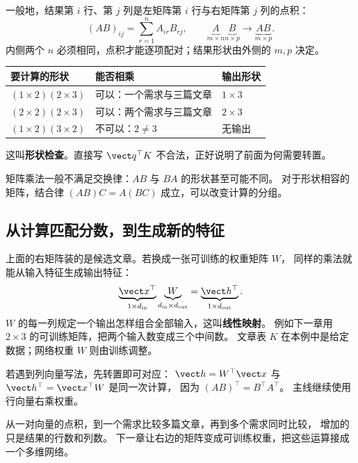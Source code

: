 一般地，结果第 $i$ 行、第 $j$ 列是左矩阵第 $i$ 行与右矩阵第 $j$ 列的点积：
\[
(AB)_{ij}=\sum_{r=1}^{n}A_{ir}B_{rj},\qquad
\underbrace{A}_{m\times n}\underbrace{B}_{n\times p}
\longrightarrow\underbrace{AB}_{m\times p}.
\]
内侧两个 $n$ 必须相同，点积才能逐项配对；结果形状由外侧的 $m,p$ 决定。
\begin{center}\small
{}
\begin{tabular}{@{}lll@{}}\toprule
要计算的形状 & 能否相乘 & 输出形状\\\midrule
$(1\times2)(2\times3)$ & 可以：一个需求与三篇文章 & $1\times3$\\
$(2\times2)(2\times3)$ & 可以：两个需求与三篇文章 & $2\times3$\\
$(1\times2)(3\times2)$ & 不可以：$2\ne3$ & 无输出\\\bottomrule
\end{tabular}
\end{center}
这叫\textbf{形状检查}。直接写 $\vect q^\top K$ 不合法，正好说明了前面为何需要转置。

\begin{warningbox}
矩阵乘法一般不满足交换律：$AB$ 与 $BA$ 的形状甚至可能不同。
对于形状相容的矩阵，结合律 $(AB)C=A(BC)$ 成立，可以改变计算的分组。
\end{warningbox}

\subsection{从计算匹配分数，到生成新的特征}
\label{concept:linear-map}

上面的右矩阵装的是候选文章。若换成一张可训练的权重矩阵 $W$，
同样的乘法就能从输入特征生成输出特征：
\[
\underbrace{\vect x^\top}_{1\times d_{\rm in}}
\underbrace{W}_{d_{\rm in}\times d_{\rm out}}
=\underbrace{\vect h^\top}_{1\times d_{\rm out}}.
\]
$W$ 的每一列规定一个输出怎样组合全部输入，这叫\textbf{线性映射}。
例如下一章用 $2\times3$ 的可训练矩阵，把两个输入数变成三个中间数。
文章表 $K$ 在本例中是给定数据；网络权重 $W$ 则由训练调整。

若遇到列向量写法，先转置即可对应：
$\vect h=W^\top\vect x$ 与 $\vect h^\top=\vect x^\top W$ 是同一次计算，
因为 $(AB)^\top=B^\top A^\top$。
主线继续使用行向量右乘权重。


\par\smallskip
从一对向量的点积，到一个需求比较多篇文章，再到多个需求同时比较，
增加的只是结果的行数和列数。
下一章让右边的矩阵变成可训练权重，把这些运算接成一个多维网络。
